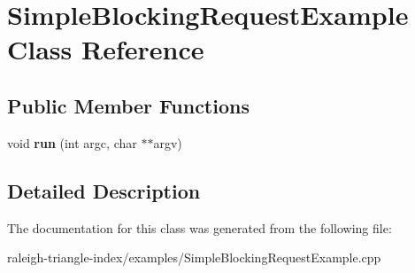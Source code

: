 \section{Simple\+Blocking\+Request\+Example Class Reference}
\label{class_simple_blocking_request_example}
\subsection*{Public Member Functions}
\begin{DoxyCompactItemize}
\item 
void {\bfseries run} (int argc, char $\ast$$\ast$argv)\label{class_simple_blocking_request_example_a9e18a83c876b4c0d0890e8883220a8ee}

\end{DoxyCompactItemize}


\subsection{Detailed Description}


The documentation for this class was generated from the following file\+:\begin{DoxyCompactItemize}
\item 
raleigh-\/triangle-\/index/examples/Simple\+Blocking\+Request\+Example.\+cpp\end{DoxyCompactItemize}
